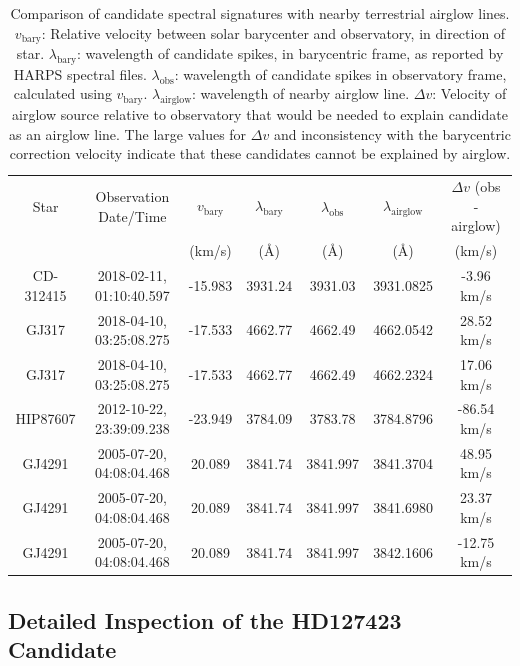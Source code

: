 \documentclass[twocolumn]{aastex701}
\begin{document}
\begin{table}
\begin{center}
    \begin{tabular}{|c|c|c|c|c|c|c|}
    \hline 
    Star & Observation Date/Time  & $v_{\mbox{bary}}$ & $\lambda_{\mbox{bary}}$ & $\lambda_{\mbox{obs}}$ & $\lambda_{\mbox{airglow}}$ & $\Delta v$ (obs - airglow) \\
    & & (km/s) & (\AA) & (\AA) & (\AA) & (km/s) \\
    \hline
    CD-312415 & 2018-02-11, 01:10:40.597 & -15.983 & 3931.24 & 3931.03 & 
    3931.0825 & -3.96 km/s \\
    GJ317 &  2018-04-10, 03:25:08.275 &  -17.533 & 4662.77 & 4662.49 & 
    4662.0542 & 28.52 km/s \\
    GJ317 &  2018-04-10, 03:25:08.275 &  -17.533 & 4662.77 & 4662.49 & 
    4662.2324 & 17.06 km/s \\
    HIP87607 & 2012-10-22, 23:39:09.238 & -23.949 & 3784.09 & 3783.78 &
    3784.8796 & -86.54 km/s \\
    GJ4291 & 2005-07-20, 04:08:04.468 & 20.089 &  3841.74 & 3841.997 &
    3841.3704 & 48.95 km/s \\
    GJ4291 & 2005-07-20, 04:08:04.468 &  20.089 &  3841.74 & 3841.997 &
    3841.6980  & 23.37 km/s \\
    GJ4291 & 2005-07-20, 04:08:04.468 &  20.089 &  3841.74 & 3841.997 &
    3842.1606  & -12.75 km/s \\
    \hline
    \end{tabular}
\end{center}    

\caption{Comparison of candidate spectral signatures with nearby terrestrial airglow lines.  $v_{\mbox{bary}}$:  Relative velocity between solar barycenter and observatory, in direction of star.  $\lambda_{\mbox{bary}}$: wavelength of candidate spikes, in barycentric frame, as reported by HARPS spectral files.  $\lambda_{\mbox{obs}}$: wavelength of candidate spikes in observatory frame, calculated using  $v_{\mbox{bary}}$. 
 $\lambda_{\mbox{airglow}}$: wavelength of nearby airglow line. $\Delta v$: Velocity of airglow source relative to observatory that would be needed to explain candidate as an airglow line.  The large values for $\Delta v$ and inconsistency with the barycentric correction velocity indicate that these candidates cannot be explained by airglow.}
\label{table:airglow_difference}
\end{table}

\subsection{Detailed Inspection of the HD127423 Candidate} 
\label{s:hd127423}
\end{document}
